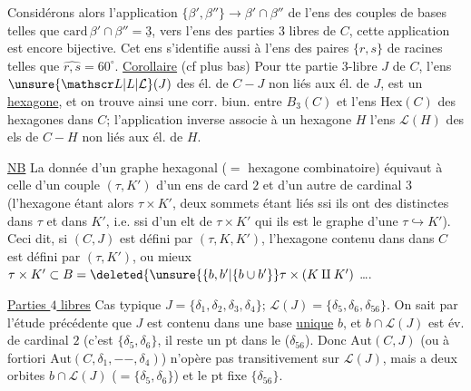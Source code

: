 Considérons alors l'application $\{\beta',\beta''\}\longrightarrow\beta'\cap\beta''$ de l'ens des couples de bases telles que $\mathrm{card}\,\beta'\cap\beta''=\underline{3}$, vers l'ens des parties $3$ libres de $C$, cette application est encore bijective. Cet ens s'identifie aussi à l'ens des paires $\{r,s\}$ de racines telles que $\widehat{r,s}=60^\circ$.
\uline{Corollaire} (cf plus bas) Pour tte partie $3$-libre $J$ de $C$, l'ens $\unsure{\mathscr L|L|\mathcal L}(J)$ des él. de $C-J$ non liés aux él. de $J$, est un \uline{hexagone}, et on trouve ainsi une corr. biun. entre $B_3(C)$ et l'ens $\mathrm{Hex}(C)$ des hexagones dans $C$; l'application inverse associe à un hexagone $H$ l'ens $\mathscr L(H)$ des els de $C-H$ non liés aux él. de $H$.

\uline{NB} La donnée d'un graphe hexagonal ($=$ hexagone combinatoire) équivaut à celle d'un couple  $(\tau,K')$ d'un ens de card $2$ et d'un autre de cardinal $3$ (l'hexagone étant alors $\tau\times K'$, deux sommets étant liés ssi ils  ont des   distinctes dans $\tau$ et dans $K'$, i.e. ssi  d'un elt de $\tau\times K'$ qui ils  est le graphe d'une  $\tau\hookrightarrow K'$). Ceci dit, si $(C,J)$ est défini par $(\tau,K,K')$, l'hexagone contenu dans dans $C$ est défini par $(\tau,K')$, ou mieux $\tau\times K'\subset B=\deleted{\unsure{\{b,b'|\{b\cup b'}}\tau\times(K\amalg K')$ \ldots.

\uline{Parties $4$ libres} Cas typique $J=\{\delta_1,\delta_2,\delta_3,\delta_4\}$; $\mathscr L(J)=\{\delta_5,\delta_6,\delta_{56}\}$.  On sait par l'étude précédente que $J$ est contenu dans une base \uline{unique} $b$, et $b\cap \mathscr L(J)$ est év. de cardinal $2$ (c'est $\{\delta_5,\delta_6\}$, il reste un pt dans le  ($\delta_{56}$). Donc $\mathrm{Aut}(C,J)$ (ou à fortiori $\mathrm{Aut}(C,\delta_1,--,\delta_4)$) n'opère pas transitivement sur $\mathscr L(J)$, mais  a deux orbites $b\cap \mathscr L(J)$ ($=\{\delta_5,\delta_6\}$) et le pt fixe $\{\delta_{56}\}$.

